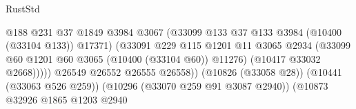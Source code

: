 \begin{lexlean}{RustStd}
\begin{coremodule}
                                                          @188
                                                          @231
                                                          @37
                                                          @1849
                                                          @3984
                                                          @3067
                                                          (@33099
                                                            @133
                                                            @37
                                                            @133
                                                            @3984
                                                            (@10400 (@33104 @133))
                                                            @17371)
                                                          (@33091
                                                            @229
                                                            @115
                                                            @1201
                                                            @11
                                                            @3065
                                                            @2934
                                                            (@33099
                                                              @60
                                                              @1201
                                                              @60
                                                              @3065
                                                              (@10400 (@33104 @60))
                                                              @11276)
                                                            (@10417 @33032 @2668)))))
                                                    @26549
                                                    @26552
                                                    @26555
                                                    @26558))
                                                (@10826 (@33058 @28))
                                                (@10441 (@33063 @526 @259))
                                                (@10296 (@33070 @259 @91 @3087 @2940))
                                                (@10873
                                                  @32926
                                                  @1865
                                                  @1203
                                                  @2940

\end{coremodule}
\end{lexlean}
